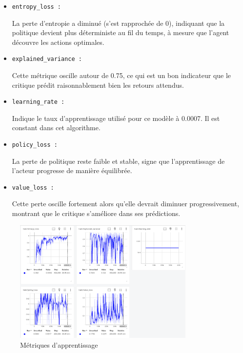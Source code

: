 \documentclass{article}
\begin{document}
        \begin{itemize} 
            \item \begin{verbatim}entropy_loss :\end{verbatim}La perte d'entropie a diminué (s’est rapprochée de 0), indiquant que la politique devient plus déterministe au fil du temps, à mesure que l'agent découvre les actions optimales.
            \item \begin{verbatim}explained_variance :\end{verbatim}Cette métrique oscille autour de 0.75, ce qui est un bon indicateur que le critique prédit raisonnablement bien les retours attendus.
            \item \begin{verbatim}learning_rate :\end{verbatim}Indique le taux d’apprentissage utilisé pour ce modèle à 0.0007. Il est constant dans cet algorithme.
            \item \begin{verbatim}policy_loss :\end{verbatim}La perte de politique reste faible et stable, signe que l'apprentissage de l'acteur progresse de manière équilibrée.
            \item \begin{verbatim}value_loss :\end{verbatim}Cette perte oscille fortement alors qu’elle devrait diminuer progressivement, montrant que le critique s'améliore dans ses prédictions.
        \end{itemize}
        
        \begin{figure}[ht]
            \centering
            \includegraphics[width=0.8\textwidth]{8.png}
            \caption{Métriques d'apprentissage}
        \end{figure}
    
\end{document}
